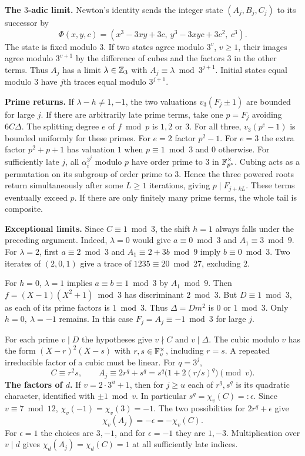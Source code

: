 \documentclass[11pt,a4paper,oneside,openany]{book}
\newcommand{\lead}[1]{\textbf{#1}\enspace}\let\para\lead
\begin{document}
\lead{The $3$-adic limit.} Newton's identity sends the integer state $(A_j,B_j,C_j)$ to its successor by
\[
 \Phi(x,y,c)=(x^3-3xy+3c,\ y^3-3xyc+3c^2,\ c^3).
\]
The state is fixed modulo $3$. If two states agree modulo $3^v$, $v\ge1$, their images agree modulo $3^{v+1}$ by the difference of cubes and the factors $3$ in the other terms. Thus $A_j$ has a limit $\lambda\in\mathbb Z_3$ with $A_j\equiv\lambda\bmod3^{j+1}$. Initial states equal modulo $3$ have $j$th traces equal modulo $3^{j+1}$.

\lead{Prime returns.} If $\lambda-h\ne1,-1$, the two valuations $v_3(F_j\pm1)$ are bounded for large $j$. If there are arbitrarily late prime terms, take one $p=F_j$ avoiding $6C\Delta$. The splitting degree $e$ of $f\bmod p$ is $1,2$ or $3$. For all three, $v_3(p^e-1)$ is bounded uniformly for these primes. For $e=2$ factor $p^2-1$. For $e=3$ the extra factor $p^2+p+1$ has valuation $1$ when $p\equiv1\bmod3$ and $0$ otherwise. For sufficiently late $j$, all $\alpha_i^{3^j}$ modulo $p$ have order prime to $3$ in $\mathbb F_{p^e}^\times$. Cubing acts as a permutation on its subgroup of order prime to $3$. Hence the three powered roots return simultaneously after some $L\ge1$ iterations, giving $p\mid F_{j+kL}$. These terms eventually exceed $p$. If there are only finitely many prime terms, the whole tail is composite.

\lead{Exceptional limits.} Since $C\equiv1\bmod3$, the shift $h=1$ always falls under the preceding argument. Indeed, $\lambda=0$ would give $a\equiv0\bmod3$ and $A_1\equiv3\bmod9$. For $\lambda=2$, first $a\equiv2\bmod3$ and $A_1\equiv2+3b\bmod9$ imply $b\equiv0\bmod3$. Two iterates of $(2,0,1)$ give a trace of $1235\equiv20\bmod27$, excluding $2$.

For $h=0$, $\lambda=1$ implies $a\equiv b\equiv1\bmod3$ by $A_1\bmod9$. Then $f=(X-1)(X^2+1)\bmod3$ has discriminant $2\bmod3$. But $D\equiv1\bmod3$, as each of its prime factors is $1\bmod3$. Thus $\Delta=Dm^2$ is $0$ or $1\bmod3$. Only $h=0,\ \lambda=-1$ remains. In this case $F_j=A_j\equiv-1\bmod3$ for large $j$.



For each prime $v\mid D$ the hypotheses give $v\nmid C$ and $v\mid\Delta$. The cubic modulo $v$ has the form $(X-r)^2(X-s)$ with $r,s\in\mathbb F_v^\times$, including $r=s$. A repeated irreducible factor of a cubic must be linear. For $q=3^j$,
\[
 C\equiv r^2s,\qquad A_j\equiv 2r^q+s^q=s^q\bigl(1+2(r/s)^q\bigr)\pmod v.
\]
\lead{The factors of $d$.} If $v=2\cdot3^u+1$, then for $j\ge u$ each of $r^q,s^q$ is its quadratic character, identified with $\pm1\bmod v$. In particular $s^q=\chi_v(C)=:\epsilon$. Since $v\equiv7\bmod12$, $\chi_v(-1)=\chi_v(3)=-1$. The two possibilities for $2r^q+\epsilon$ give
\[
 \chi_v(A_j)=-\epsilon=-\chi_v(C).
\]
For $\epsilon=1$ the choices are $3,-1$, and for $\epsilon=-1$ they are $1,-3$. Multiplication over $v\mid d$ gives $\chi_d(A_j)=\chi_d(C)=1$ at all sufficiently late indices.
\end{document}
